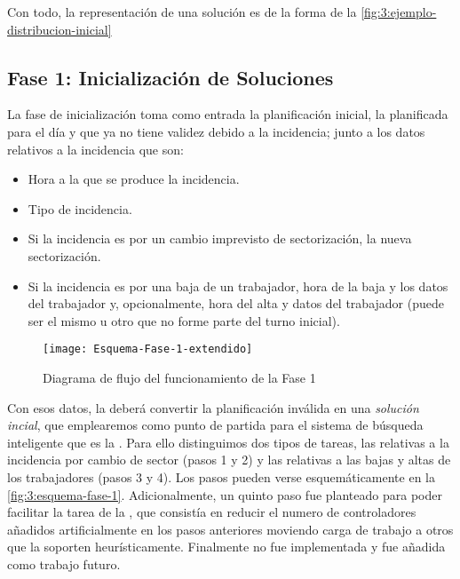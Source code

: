 Con todo, la representación de una solución es de la forma de la \autoref{fig:3:ejemplo-distribucion-inicial}

\subsection{Fase 1: Inicialización de Soluciones} \label{sec:3:inicializacion-soluciones}

La fase de inicialización toma como entrada la planificación inicial, la planificada para el día y que ya no tiene 
validez debido a la incidencia; junto a los datos relativos a la incidencia que son:

\begin{itemize}
	\item Hora a la que se produce la incidencia.
	\item Tipo de incidencia.
	\item Si la incidencia es por un cambio imprevisto de sectorización, la nueva sectorización.
	\item Si la incidencia es por una baja de un trabajador, hora de la baja y los datos del trabajador y, 
	opcionalmente, hora del alta y datos del trabajador (puede ser el mismo u otro que no forme parte del turno 
	inicial).
\end{itemize}

\begin{figure}[htbp]
	\centering
	\texttt{[image: Esquema-Fase-1-extendido]}
	\caption{Diagrama de flujo del funcionamiento de la Fase 1}
	\label{fig:3:esquema-fase-1}
\end{figure}

Con esos datos, la \faseuno{} deberá convertir la planificación inválida en una \textit{solución incial}, que 
emplearemos 
como punto de partida para el sistema de búsqueda inteligente que es la \fasedos{}. Para ello distinguimos dos tipos de 
tareas, las relativas a la incidencia por cambio de sector (pasos 1 y 2) y las relativas a las bajas y altas de los 
trabajadores (pasos 3 y 4). Los pasos pueden verse esquemáticamente en la \autoref{fig:3:esquema-fase-1}.
Adicionalmente, un quinto paso fue planteado para poder facilitar la tarea de la \fasedos{}, que consistía en reducir 
el numero de controladores añadidos artificialmente en los pasos anteriores moviendo carga de trabajo a otros que la 
soporten heurísticamente. Finalmente no fue implementada y fue añadida como trabajo futuro.
\\

